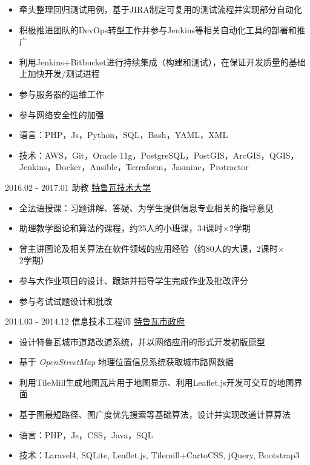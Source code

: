 \documentclass[letterpaper]{twentysecondcv} %
\begin{document}
\begin{twentyfluid}
{{\begin{itemize}
        \item 牵头整理回归测试用例，基于JIRA制定可复用的测试流程并实现部分自动化
        \item 积极推进团队的DevOps转型工作并参与Jenkins等相关自动化工具的部署和推广
        \item 利用Jenkins+Bitbucket进行持续集成（构建和测试），在保证开发质量的基础上加快开发/测试进程
        \item 参与服务器的运维工作
        \item 参与网络安全性的加强
        \item 语言：PHP，Js，Python，SQL，Bash，YAML，XML
        \item 技术：AWS，Git，Oracle 11g，PostgreSQL，PostGIS，ArcGIS，QGIS，Jenkins，Docker，Ansible，Terraform，Jasmine，Protractor
    \end{itemize}
    }
    }

\twentyitemfluid
    	{2016.02 - 2017.01}
        {助教}
        {\href{http://www.utt.fr/}{特鲁瓦技术大学}}
        {\\  }
        {
        {
        \vspace{-0.2cm}
        \begin{itemize}
            \item 全法语授课：习题讲解、答疑、为学生提供信息专业相关的指导意见
        	\item 助理教学图论和算法的课程，约25人的小班课，34课时$\times$2学期
        	\item 曾主讲图论及相关算法在软件领域的应用经验（约80人的大课，2课时$\times$2学期）
        	\item 参与大作业项目的设计、跟踪并指导学生完成作业及批改评分
        	\item 参与考试试题设计和批改
        \end{itemize}
        }
        }

\twentyitemfluid
        {2014.03 - 2014.12}
        {信息技术工程师}
        {\href{https://www.ville-troyes.fr/}{特鲁瓦市政府}}
        {\\   }
        {
        {
        \vspace{-0.2cm}
        \begin{itemize}
            \item 设计特鲁瓦城市道路改道系统，并以网络应用的形式开发初版原型
            \item 基于 \textit{OpenStreetMap} 地理位置信息系统获取城市路网数据
            \item 利用TileMill生成地图瓦片用于地图显示、利用Leaflet.js开发可交互的地图界面
            \item 基于图最短路径、图广度优先搜索等基础算法，设计并实现改道计算算法
            \item 语言：PHP，Js，CSS，Java，SQL
            \item 技术：Laravel4, SQLite, Leaflet.js, Tilemill+CartoCSS, jQuery, Bootstrap3
        \end{itemize}
        }
        }


\end{twentyfluid}
\end{document}
